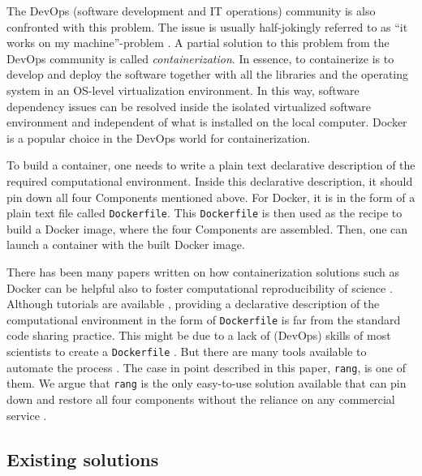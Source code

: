 \documentclass[
  10pt,
  letterpaper,
]{article}
\begin{document}
The DevOps (software development and IT operations) community is also
confronted with this problem. The issue is usually half-jokingly
referred to as ``it works on my machine''-problem \citep[a software
works on someone's local machine but is not working anymore when
deployed to the production system, indicates the software tacitly
depends on the computational environment of the local
machine]{valstar:2020:UDS}. A partial solution to this problem from the
DevOps community is called \emph{containerization}. In essence, to
containerize is to develop and deploy the software together with all the
libraries and the operating system in an OS-level virtualization
environment. In this way, software dependency issues can be resolved
inside the isolated virtualized software environment and independent of
what is installed on the local computer. Docker is a popular choice in
the DevOps world for containerization.

To build a container, one needs to write a plain text declarative
description of the required computational environment. Inside this
declarative description, it should pin down all four Components
mentioned above. For Docker, it is in the form of a plain text file
called \texttt{Dockerfile}. This \texttt{Dockerfile} is then used as the
recipe to build a Docker image, where the four Components are assembled.
Then, one can launch a container with the built Docker image.

There has been many papers written on how containerization solutions
such as Docker can be helpful also to foster computational
reproducibility of science
\citep[e.g.][]{nuest:2019, peikert:2021:RDA, boettiger:2017:IR}.
Although tutorials are available \citep[e.g.][]{nuest:2019}, providing a
declarative description of the computational environment in the form of
\texttt{Dockerfile} is far from the standard code sharing practice. This
might be due to a lack of (DevOps) skills of most scientists to create a
\texttt{Dockerfile} \citep{kim:2018:E}. But there are many tools
available to automate the process \citep[e.g.][]{nuest:2019}. The case
in point described in this paper, \texttt{rang}, is one of them. We
argue that \texttt{rang} is the only easy-to-use solution available that
can pin down and restore all four components without the reliance on any
commercial service .

\hypertarget{existing-solutions}{%
\subsection{Existing solutions}\label{existing-solutions}}
\end{document}
